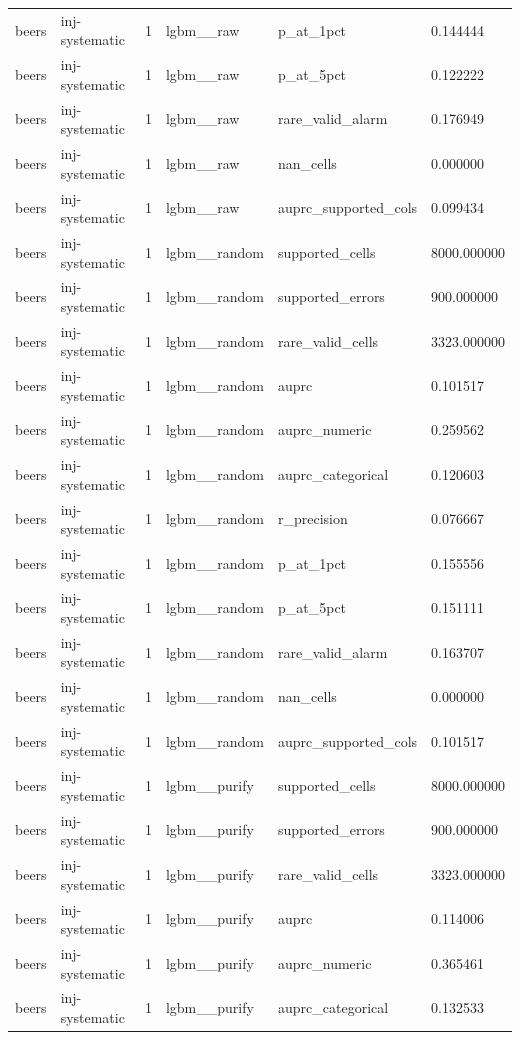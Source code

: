 \begin{tabular}{llllll}
beers & inj-systematic & 1 & lgbm\_\_raw & p\_at\_1pct & 0.144444 \\
beers & inj-systematic & 1 & lgbm\_\_raw & p\_at\_5pct & 0.122222 \\
beers & inj-systematic & 1 & lgbm\_\_raw & rare\_valid\_alarm & 0.176949 \\
beers & inj-systematic & 1 & lgbm\_\_raw & nan\_cells & 0.000000 \\
beers & inj-systematic & 1 & lgbm\_\_raw & auprc\_supported\_cols & 0.099434 \\
beers & inj-systematic & 1 & lgbm\_\_random & supported\_cells & 8000.000000 \\
beers & inj-systematic & 1 & lgbm\_\_random & supported\_errors & 900.000000 \\
beers & inj-systematic & 1 & lgbm\_\_random & rare\_valid\_cells & 3323.000000 \\
beers & inj-systematic & 1 & lgbm\_\_random & auprc & 0.101517 \\
beers & inj-systematic & 1 & lgbm\_\_random & auprc\_numeric & 0.259562 \\
beers & inj-systematic & 1 & lgbm\_\_random & auprc\_categorical & 0.120603 \\
beers & inj-systematic & 1 & lgbm\_\_random & r\_precision & 0.076667 \\
beers & inj-systematic & 1 & lgbm\_\_random & p\_at\_1pct & 0.155556 \\
beers & inj-systematic & 1 & lgbm\_\_random & p\_at\_5pct & 0.151111 \\
beers & inj-systematic & 1 & lgbm\_\_random & rare\_valid\_alarm & 0.163707 \\
beers & inj-systematic & 1 & lgbm\_\_random & nan\_cells & 0.000000 \\
beers & inj-systematic & 1 & lgbm\_\_random & auprc\_supported\_cols & 0.101517 \\
beers & inj-systematic & 1 & lgbm\_\_purify & supported\_cells & 8000.000000 \\
beers & inj-systematic & 1 & lgbm\_\_purify & supported\_errors & 900.000000 \\
beers & inj-systematic & 1 & lgbm\_\_purify & rare\_valid\_cells & 3323.000000 \\
beers & inj-systematic & 1 & lgbm\_\_purify & auprc & 0.114006 \\
beers & inj-systematic & 1 & lgbm\_\_purify & auprc\_numeric & 0.365461 \\
beers & inj-systematic & 1 & lgbm\_\_purify & auprc\_categorical & 0.132533 \\

\end{tabular}
